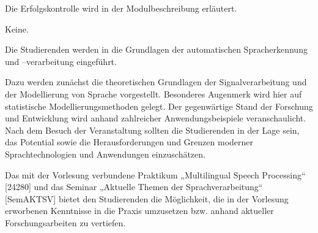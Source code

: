 \begin{course}

\setdoclanguagegerman
{}



\coursehead


\label{cour_7267.dp_997}


\begin{styleenv}
\begin{assessment}
Die Erfolgskontrolle wird in der Modulbeschreibung erläutert.


\end{assessment}

\begin{conditions}Keine.\end{conditions}


\end{styleenv}

\begin{learningoutcomes}
Die Studierenden werden in die Grundlagen der automatischen Spracherkennung und –verarbeitung eingeführt.

 

Dazu werden zunächst die theoretischen Grundlagen der Signalverarbeitung und der Modellierung von Sprache vorgestellt. Besonderes Augenmerk wird hier auf statistische Modellierungsmethoden gelegt. Der gegenwärtige Stand der Forschung und Entwicklung wird anhand zahlreicher Anwendungsbeispiele veranschaulicht. Nach dem Besuch der Veranstaltung sollten die Studierenden in der Lage sein, das Potential sowie die Herausforderungen und Grenzen moderner Sprachtechnologien und Anwendungen einzuschätzen.

 

Das mit der Vorlesung verbundene Praktikum „Multilingual Speech Processing“ [24280] und das Seminar „Aktuelle Themen der Sprachverarbeitung“ [SemAKTSV] bietet den Studierenden die Möglichkeit, die in der Vorlesung erworbenen Kenntnisse in die Praxis umzusetzen bzw. anhand aktueller Forschungsarbeiten zu vertiefen.



\end{learningoutcomes}
\end{course}
